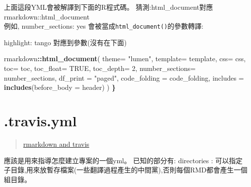 \documentclass[]{book}
\newenvironment{Shaded}{\begin{snugshade}}{\end{snugshade}}
\newcommand{\AttributeTok}[1]{\textcolor[rgb]{0.77,0.63,0.00}{#1}}
\newcommand{\DataTypeTok}[1]{\textcolor[rgb]{0.13,0.29,0.53}{#1}}
\newcommand{\DecValTok}[1]{\textcolor[rgb]{0.00,0.00,0.81}{#1}}
\newcommand{\ErrorTok}[1]{\textcolor[rgb]{0.64,0.00,0.00}{\textbf{#1}}}
\newcommand{\FunctionTok}[1]{\textcolor[rgb]{0.00,0.00,0.00}{#1}}
\newcommand{\KeywordTok}[1]{\textcolor[rgb]{0.13,0.29,0.53}{\textbf{#1}}}
\newcommand{\NormalTok}[1]{#1}
\newcommand{\OperatorTok}[1]{\textcolor[rgb]{0.81,0.36,0.00}{\textbf{#1}}}
\newcommand{\OtherTok}[1]{\textcolor[rgb]{0.56,0.35,0.01}{#1}}
\newcommand{\StringTok}[1]{\textcolor[rgb]{0.31,0.60,0.02}{#1}}
\theoremstyle{definition}
\theoremstyle{definition}
\theoremstyle{definition}
\theoremstyle{remark}
\begin{document}
上面這段YML會被解譯到下面的R程式碼。
猜測:html\_document對應rmarkdown::html\_document\\
例如, number\_sections: yes 會被當成\texttt{html\_document()}的參數轉譯:

highlight: tango 對應到參數(沒有在下面)

\begin{Shaded}
\begin{Highlighting}[]
\NormalTok{rmarkdown}\OperatorTok{::}\KeywordTok{html_document}\NormalTok{( }\DataTypeTok{theme=} \StringTok{"lumen"}\NormalTok{,}
                               \DataTypeTok{template=}\NormalTok{ template,}
                               \DataTypeTok{css=}\NormalTok{ css,}
                               \DataTypeTok{toc=}\NormalTok{ toc,}
                               \DataTypeTok{toc_float=} \OtherTok{TRUE}\NormalTok{,}
                               \DataTypeTok{toc_depth=} \DecValTok{2}\NormalTok{,}
                               \DataTypeTok{number_sections=}\NormalTok{ number_sections,}
                               \DataTypeTok{df_print =} \StringTok{"paged"}\NormalTok{,}
                               \DataTypeTok{code_folding =}\NormalTok{ code_folding,}
                               \DataTypeTok{includes =} \KeywordTok{includes}\NormalTok{(}\DataTypeTok{before_body =}\NormalTok{ header)}
\NormalTok{                            )}
\ErrorTok{\}}
\end{Highlighting}
\end{Shaded}

\hypertarget{travis.yml}{%
\section{.travis.yml}\label{travis.yml}}

\begin{quote}
\href{http://www.goring.org/resources/Adding_CI_To_RMarkdown.html}{rmarkdown
and travis}
\end{quote}

應該是用來指導怎麼建立專案的一個yml。 已知的部分有: directories :
可以指定子目錄,用來放暫存檔案(一些翻譯過程產生的中間黨),否則每個RMD都會產生一個組目錄。

\begin{Shaded}
\end{Shaded}
\end{document}
